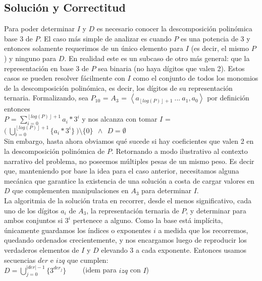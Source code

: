 \subsection{Solución y Correctitud}
	Para poder determinar $I$ y $D$ es necesario conocer la descomposición polinómica base 3 de $P$. El caso más simple de analizar es cuando $P$ es una potencia de 3 y entonces solamente requerimos de un único elemento para $I$ (es decir, el mismo $P$) y ninguno para $D$. En realidad este es un subcaso de otro más general: que la representación en base 3 de $P$ sea binaria (no haya dígitos que valen 2). Estos casos se pueden resolver fácilmente con $I$ como el conjunto de todos los monomios de la descomposición polinómica, es decir, los dígitos de su representación ternaria. Formalizando, sea $P_{10}$ = $A_3$ = $\left \langle a_{ \left \lfloor{log(P)}\right \rfloor + 1 } \ ... \ a_1, a_0  \right \rangle$ por definición entonces \\

	$P$ = $\sum_{i = 0}^{\left \lfloor{log(P)}\right \rfloor + 1} a_i*3^{i}$ y nos alcanza con tomar $I$ = $\bigl ( \ \bigcup_{i=0}^{\left \lfloor{log(P)}\right \rfloor + 1} \{a_i*3^{i}\} \ \bigr ) \setminus \{0\} \ \ \wedge \ \ D = \emptyset $
	\\

	Sin embargo, hasta ahora obviamos qué sucede si hay coeficientes que valen 2 en la descomposición polinómica de $P$. Retornando a modo ilustrativo al contexto narrativo del problema, no poseemos múltiples pesas de un mismo peso. Es decir que, manteniendo por base la idea para el caso anterior, necesitamos alguna mecánica que garantice la existencia de una solución a costa de cargar valores en $D$ que complementen manipulaciones en $A_3$ para determinar $I$.
	\\

	La algoritmia de la solución trata en recorrer, desde el menos significativo, cada uno de los dígitos $a_i$ de $A_3$, la representación ternaria de $P$, y determinar para ambos conjuntos si $3^{i}$ pertenece a alguno. Como la base está implícita, únicamente guardamos los índices o exponentes $i$ a medida que los recorremos, quedando ordenados crecientemente, y nos encargamos luego de reproducir los verdaderos elementos de $I$ y $D$ elevando 3 a cada exponente. Entonces usamos secuencias $der$ e $izq$ que cumplen:
	\\

	$D = \bigcup_{j=0}^{|der|-1} \{3^{der_{j}}\}  $   \  \ \ \ (idem para $izq$ con $I$)
	\\

